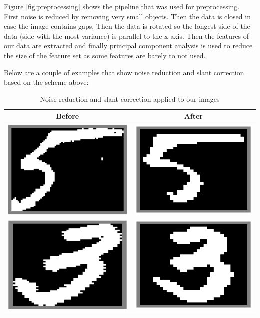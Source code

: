 \documentclass[%
        compressed,
        final,
        notitlepage,
        narroweqnarray,
        inline,
        twoside,
        ]{ieee}
\begin{document}
Figure \ref{fig:preprocessing} shows the pipeline that was used for preprocessing. First noise is reduced by removing very small objects. Then the data is closed in case the image contains gaps. Then the data is rotated so the longest side of the data (side with the most variance) is parallel to the x axis. Then the features of our data are extracted and finally principal component analysis is used to reduce the size of the feature set as some features are barely to not used.

Below are a couple of examples that show noise reduction and slant correction
based on the scheme above:

\begin{table}
    \begin{tabular}{|c|c|}
        \hline
        Before & After \\
        \hline
    \includegraphics[width=.4\columnwidth]{images/dirty5.png}
    &\includegraphics[width=.4\columnwidth]{images/clean5.png}\\
    \includegraphics[width=.4\columnwidth]{images/dirty3.png}
    &\includegraphics[width=.4\columnwidth]{images/clean3.png}\\
        \hline
    \end{tabular}
    \caption{Noise reduction and slant correction applied to our images}
\end{table}
\end{document}

